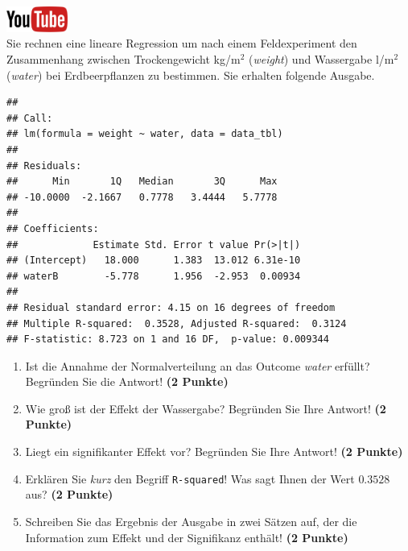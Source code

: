 \documentclass[a4paper, 9pt]{scrartcl}\usepackage[]{graphicx}\usepackage[]{xcolor}
\makeatletter
\newenvironment{kframe}{%
 \def\at@end@of@kframe{}%
 \ifinner\ifhmode%
  \def\at@end@of@kframe{\end{minipage}}%
  \begin{minipage}{\columnwidth}%
 \fi\fi%
 \def\FrameCommand##1{\hskip\@totalleftmargin \hskip-\fboxsep
 \colorbox{shadecolor}{##1}\hskip-\fboxsep
     \hskip-\linewidth \hskip-\@totalleftmargin \hskip\columnwidth}%
 \MakeFramed {\advance\hsize-\width
   \@totalleftmargin\z@ \linewidth\hsize
   \@setminipage}}%
 {\par\unskip\endMakeFramed%
 \at@end@of@kframe}
\newenvironment{knitrout}{}{} %
\makeatother
\begin{document}
\hfill\href{https://youtu.be/tNNzcndrpSk}{\includegraphics[width =
  2cm]{img/youtube}}\\[1Ex]

Sie rechnen eine lineare Regression um nach einem Feldexperiment den
Zusammenhang zwischen Trockengewicht kg/m$^2$ (\textit{weight}) und
Wassergabe l/m$^2$ (\textit{water}) bei Erdbeerpflanzen zu bestimmen. Sie
erhalten folgende \Rlogo Ausgabe.

\begin{knitrout}
\color{fgcolor}\begin{kframe}
\begin{verbatim}
## 
## Call:
## lm(formula = weight ~ water, data = data_tbl)
## 
## Residuals:
##      Min       1Q   Median       3Q      Max 
## -10.0000  -2.1667   0.7778   3.4444   5.7778 
## 
## Coefficients:
##             Estimate Std. Error t value Pr(>|t|)
## (Intercept)   18.000      1.383  13.012 6.31e-10
## waterB        -5.778      1.956  -2.953  0.00934
## 
## Residual standard error: 4.15 on 16 degrees of freedom
## Multiple R-squared:  0.3528,	Adjusted R-squared:  0.3124 
## F-statistic: 8.723 on 1 and 16 DF,  p-value: 0.009344
\end{verbatim}
\end{kframe}
\end{knitrout}


\begin{enumerate}
\item Ist die Annahme der Normalverteilung an das Outcome \textit{water}
  erf{\"u}llt?  Begr{\"u}nden Sie die Antwort! \textbf{(2 Punkte)}
\item Wie gro{\ss} ist der Effekt der Wassergabe?  Begr{\"u}nden Sie Ihre Antwort! \textbf{(2 Punkte)} 
\item Liegt ein signifikanter
  Effekt vor? Begr{\"u}nden Sie Ihre Antwort! \textbf{(2 Punkte)}
\item Erkl{\"a}ren Sie \textit{kurz} den Begriff \texttt{R-squared}!
  Was sagt Ihnen der Wert $0.3528$ aus? \textbf{(2 Punkte)}
\item Schreiben Sie das Ergebnis der \Rlogo Ausgabe in zwei S{\"a}tzen auf, der die
  Information zum Effekt und der Signifikanz enth{\"a}lt! \textbf{(2 Punkte)} 
\end{enumerate}
 
\end{document}

